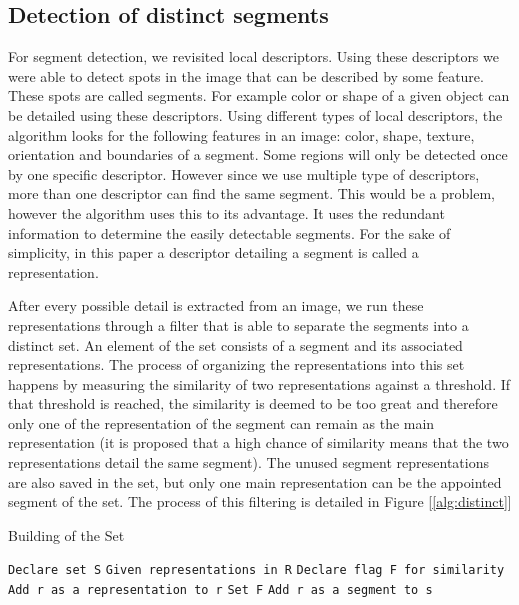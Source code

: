 \subsection{Detection of distinct segments} %
For segment detection, we revisited local descriptors. Using these descriptors we were able to detect spots in the image that can be described by some feature. These spots are called segments. For example color or shape of a given object can be detailed using these descriptors. Using different types of local descriptors, the algorithm looks for the following features in an image: color, shape, texture, orientation and boundaries of a segment. Some regions will only be detected once by one specific descriptor. However since we use multiple type of descriptors, more than one descriptor can find the same segment. This would be a problem, however the algorithm uses this to its advantage. It uses the redundant information to determine the easily detectable segments. For the sake of simplicity, in this paper a descriptor detailing a segment is called a representation.

After every possible detail is extracted from an image, we run these representations through a filter that is able to separate the segments into a distinct set. An element of the set consists of a segment and its associated representations. The process of organizing the representations into this set happens by measuring the similarity of two representations against a threshold. If that threshold is reached, the similarity is deemed to be too great and therefore only one of the representation of the segment can remain as the main representation (it is proposed that a high chance of similarity means that the two representations detail the same segment). The unused segment representations are also saved in the set, but only one main representation can be the appointed segment of the set. The process of this filtering is detailed in Figure [\ref{alg:distinct}]

\begin{algorithm}
\caption{Building of the Set}\label{alg:distinct}
\begin{algorithmic}
    \State \texttt{Declare set S}
    \State \texttt{Given representations in R}
        \State \texttt{Declare flag F for similarity}
                \State \texttt{Add r as a representation to r}
                \State \texttt{Set F}
            \EndIf
        \EndFor
            \State \texttt{Add r as a segment to s}
        \EndIf
    \EndFor
\end{algorithmic}
\end{algorithm}


